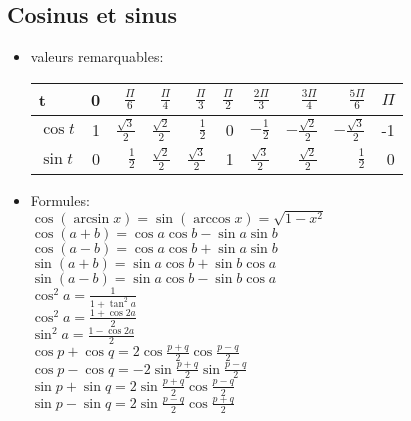 \documentclass[fleqn]{article}
\begin{document}
\subsection{Cosinus et sinus}
\begin{itemize}
	\item valeurs remarquables:\\
		\begin{tabular}{@{}lrrrrrrrrr@{}}
			\toprule
			t & 0 & $\frac{\Pi}{6}$ & $\frac{\Pi}{4}$ & $\frac{\Pi}{3}$ & $\frac{\Pi}{2}$ & $\frac{2\Pi}{3}$ & $\frac{3\Pi}{4}$
				& $\frac{5\Pi}{6}$ & $\Pi$ \\
			\hline
			$\cos t$ & 1 & $\frac{\sqrt{3}}{2}$ & $\frac{\sqrt{2}}{2}$ & $\frac{1}{2}$ & 0 & $-\frac{1}{2}$ & $-\frac{\sqrt{2}}{2}$
				& $-\frac{\sqrt{3}}{2}$ & -1 \\
			$\sin t$ & 0 & $\frac{1}{2}$ & $\frac{\sqrt{2}}{2}$ & $\frac{\sqrt{3}}{2}$ & 1 & $\frac{\sqrt{3}}{2}$ & $\frac{\sqrt{2}}{2}$
				& $\frac{1}{2}$ & 0 \\
			\bottomrule
		\end{tabular}

	\item Formules: \\
		$\cos(\arcsin x) = \sin(\arccos x) = \sqrt{1 - x^2}$ \\
		$\cos (a+b) = \cos a\cos b - \sin a\sin b$ \\
		$\cos (a-b) = \cos a\cos b + \sin a\sin b$ \\
		$\sin (a+b) = \sin a\cos b + \sin b\cos a$ \\
		$\sin (a-b) = \sin a\cos b - \sin b\cos a$ \\
		$\cos^2 a = \frac{1}{1 + \tan^2a}$ \\
		$\cos^2 a = \frac{1 + \cos 2a}{2}$ \\
		$\sin^2 a = \frac{1 - \cos 2a}{2}$ \\
		\newline
		$\cos p + \cos q = 2\cos\frac{p+q}{2}\cos\frac{p-q}{2}$ \\
		$\cos p - \cos q = -2\sin\frac{p+q}{2}\sin\frac{p-q}{2}$ \\
		$\sin p + \sin q = 2\sin\frac{p+q}{2}\cos\frac{p-q}{2}$ \\
		$\sin p - \sin q = 2\sin\frac{p-q}{2}\cos\frac{p+q}{2}$ \\
\end{itemize}
\end{document}
